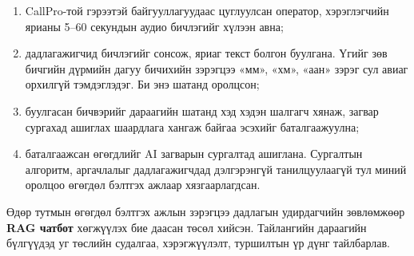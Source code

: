 \documentclass[../main.tex]{subfiles}
\begin{document}
\begin{enumerate}
  \item CallPro-той гэрээтэй байгууллагуудаас цуглуулсан оператор,
  хэрэглэгчийн ярианы 5--60 секундын аудио бичлэгийг хүлээн авна;
  \item дадлагажигчид бичлэгийг сонсож, яриаг текст болгон буулгана.
  Үгийг зөв бичгийн дүрмийн дагуу бичихийн зэрэгцээ «мм», «хм», «аан»
  зэрэг сул авиаг орхилгүй тэмдэглэдэг. Би энэ шатанд оролцсон;
  \item буулгасан бичвэрийг дараагийн шатанд хэд хэдэн шалгагч хянаж,
  загвар сургахад ашиглах шаардлага хангаж байгаа эсэхийг баталгаажуулна;
  \item баталгаажсан өгөгдлийг AI загварын сургалтад ашиглана.
  Сургалтын алгоритм, аргачлалыг дадлагажигчдад дэлгэрэнгүй
  танилцуулаагүй тул миний оролцоо өгөгдөл бэлтгэх ажлаар хязгаарлагдсан.
\end{enumerate}

Өдөр тутмын өгөгдөл бэлтгэх ажлын зэрэгцээ дадлагын удирдагчийн
зөвлөмжөөр \textbf{RAG чатбот} хөгжүүлэх бие даасан төсөл хийсэн.
Тайлангийн дараагийн бүлгүүдэд уг төслийн судалгаа, хэрэгжүүлэлт,
туршилтын үр дүнг тайлбарлав.
\end{document}
